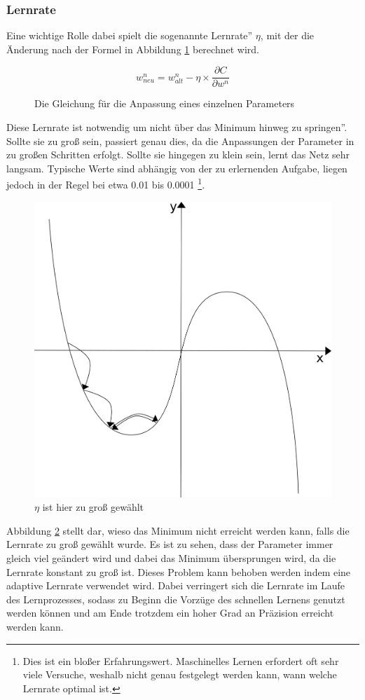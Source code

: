 \documentclass{article}
\begin{document}
\subsubsection{Lernrate}
Eine wichtige Rolle dabei spielt die sogenannte \glqq Lernrate'' $\eta$, mit der die Änderung nach der Formel in Abbildung \ref{Learning_Rate_Function} berechnet wird.
\begin{figure}[h]
	\begin{equation*}
	w^n_{neu}=w^n_{alt}-\eta\times\frac{\partial C}{\partial w^n}
	\end{equation*}
	\caption{Die Gleichung für die Anpassung eines einzelnen Parameters}
	\label{Learning_Rate_Function}
\end{figure}
\newline
Diese Lernrate ist notwendig um nicht über das Minimum \glqq hinweg zu springen''. Sollte sie zu groß sein, passiert genau dies, da die Anpassungen der Parameter in zu großen Schritten erfolgt. Sollte sie hingegen zu klein sein, lernt das Netz sehr langsam. Typische Werte sind abhängig von der zu erlernenden Aufgabe, liegen jedoch in der Regel bei etwa 0.01 bis 0.0001 \footnote{Dies ist ein bloßer Erfahrungswert. Maschinelles Lernen erfordert oft sehr viele Versuche, weshalb nicht genau festgelegt werden kann, wann welche Lernrate optimal ist.}.
\begin{figure}[h]
	\begin{center}
		\includegraphics[width=0.5\linewidth]{../graphics/gdf_big_lr.png}
	\end{center}
	\caption{$\eta$ ist hier zu groß gewählt}
	\label{Learning_Rate_Graphic}
\end{figure}
\newline
Abbildung \ref{Learning_Rate_Graphic} stellt dar, wieso das Minimum nicht erreicht werden kann, falls die Lernrate zu groß gewählt wurde. Es ist zu sehen, dass der Parameter immer gleich viel geändert wird und dabei das Minimum übersprungen wird, da die Lernrate konstant zu groß ist. Dieses Problem kann behoben werden indem eine adaptive Lernrate verwendet wird. Dabei verringert sich die Lernrate im Laufe des Lernprozesses, sodass zu Beginn die Vorzüge des schnellen Lernens genutzt werden können und am Ende trotzdem ein hoher Grad an Präzision erreicht werden kann.
\end{document}
